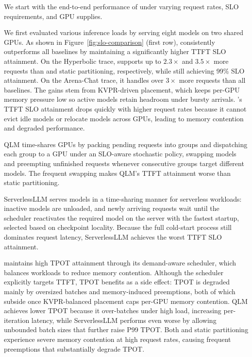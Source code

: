 \label{sec:e2e}

We start with the end-to-end performance of \tool under varying request rates, SLO requirements, and GPU supplies.

We first evaluated various inference loads by serving eight models on two shared GPUs.
As shown in Figure~\ref{fig:slo-comparison} (first row), \tool consistently outperforms all baselines by maintaining a significantly higher TTFT SLO attainment.
On the Hyperbolic trace, \tool supports up to $2.3\times$ and $3.5\times$ more requests than \muxp and static partitioning, respectively, while still achieving 99\% SLO attainment. On the Arena-Chat trace, it handles over $3\times$ more requests than all baselines. The gains stem from KVPR-driven placement, which keeps per-GPU memory pressure low so active models retain headroom under bursty arrivals.
\muxp's TTFT SLO attainment drops quickly with higher request rates because it cannot evict idle models or relocate models across GPUs, leading to memory contention and degraded performance.

QLM time-shares GPUs by packing pending requests into groups and dispatching each group to a GPU under an SLO-aware stochastic policy, swapping models and preempting unfinished requests whenever consecutive groups target different models. The frequent swapping makes QLM's TTFT attainment worse than static partitioning.

ServerlessLLM serves models in a time-sharing manner for serverless workloads: inactive models are unloaded, and newly arriving requests wait until the scheduler reactivates the required model on the server with the fastest startup, selected based on checkpoint locality. Because the full cold-start process still dominates request latency, ServerlessLLM achieves the worst TTFT SLO attainment.

\tool maintains high TPOT attainment through its demand-aware scheduler, which balances workloads to reduce memory contention. Although the scheduler explicitly targets TTFT, TPOT benefits as a side effect: TPOT is degraded mainly by oversized batches and memory-induced preemptions, both of which subside once KVPR-balanced placement caps per-GPU memory contention. QLM achieves lower TPOT because it over-batches under high load, increasing per-iteration latency, while ServerlessLLM performs even worse by allowing unbounded batch sizes that further raise P99 TPOT. Both \muxp and static partitioning experience severe memory contention at high request rates, causing frequent preemptions that substantially degrade TPOT.

